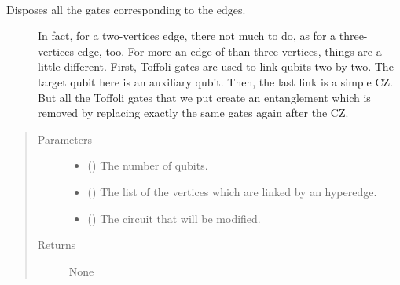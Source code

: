 \documentclass[letterpaper,10pt,english]{sphinxmanual}
\begin{document}

\begin{fulllineitems}
\label{\detokenize{hypergraphstates:mermin_on_qiskit.hypergraphstates.edges_layout}}~\begin{description}
\item[{Disposes all the gates corresponding to the edges.}] \leavevmode
In fact, for a two-vertices edge, there not much to do, as for a 
three-vertices edge, too.
For more an edge of than three vertices, things are a little different. 
First, Toffoli gates are used to link qubits
two by two. The target qubit here is an auxiliary qubit.
Then, the last link is a simple CZ.
But all the Toffoli gates that we put create an entanglement which is 
removed by replacing exactly the same gates again after the CZ.

\end{description}
\begin{quote}\begin{description}
\item[{Parameters}] \leavevmode\begin{itemize}
\item {} 
 () \textendash{} The number of qubits.

\item {} 
 (\sphinxstyleliteralemphasis{\sphinxupquote{{[}}}\sphinxstyleliteralemphasis{\sphinxupquote{{[}}}\sphinxstyleliteralemphasis{\sphinxupquote{{]}}}) \textendash{} The list of the vertices which are linked
by an hyperedge.

\item {} 
 () \textendash{} The circuit that will be modified.

\end{itemize}

\item[{Returns}] \leavevmode
None

\end{description}\end{quote}

\end{fulllineitems}
\end{document}
